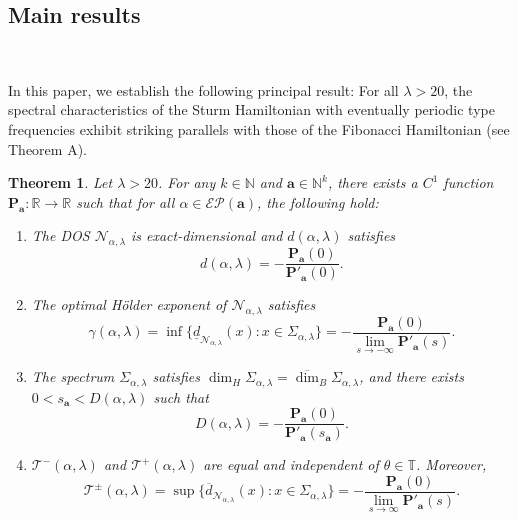 \documentclass[reqno,11pt,graphicx,]{amsart}
\numberwithin{equation}{section}
\theoremstyle{plain}
\newcommand{\N}{{\mathbb N}}
\newcommand{\R}{{\mathbb R}}
\newcommand{\p}{\mathbf P}
\newcommand{\3}{\mathbf{3}}
\newcommand{\ma}{\mathbf{a}}
\newtheorem{theorem}{Theorem}[section]
\begin{document}
	\subsection{Main results}\
	
	
	In this paper, we establish the following principal result: For all $\lambda>20$, the spectral characteristics of the Sturm Hamiltonian with eventually periodic type frequencies exhibit striking parallels with those of the Fibonacci Hamiltonian (see Theorem A).
	\begin{theorem}\label{main-result}
		Let $\lambda>20$. For any $k\in\N$ and $\ma\in\N^k$, there exists a $C^1$ function $\p_{\ma}:\R\to\R$ such that for all $\alpha\in\mathcal{EP}(\ma)$, the following hold:
		\begin{enumerate}[label=(\roman*)]
			\item The DOS $\mathcal{N}_{\alpha,\lambda}$ is exact-dimensional and $d(\alpha,\lambda)$ satisfies
			\begin{equation*}\label{1}
				d(\alpha,\lambda)=%
				-\frac{\p_{\ma}(0)}{\p'_{\ma}(0)}.
			\end{equation*}
			\item The optimal H\"older exponent of $\mathcal{N}_{\alpha,\lambda}$ satisfies 
			\begin{equation}\label{2} \gamma(\alpha,\lambda)=\inf\{\underline{d}_{\mathcal{N}_{\alpha,\lambda}}(x):x\in\Sigma_{\alpha,\lambda}\}=-\frac{\p_{\ma}(0)}{\lim\limits_{s\to-\infty}\p'_{\ma}(s)}.
			\end{equation}
			\item
			The spectrum $\Sigma_{\alpha,\lambda}$ satisfies
			$
			\dim_H \Sigma_{\alpha,\lambda}=\overline{\dim}_B \Sigma_{\alpha,\lambda}
			$, and there exists $0<s_{\ma}<D(\alpha,\lambda)$ such that
			\begin{equation}\label{3}
				D(\alpha,\lambda)%
				=-\frac{\p_{\ma}(0)}{\p'_{\ma}(s_{\ma})}.
			\end{equation}
			\item $\mathcal{T}^-(\alpha,\lambda)$ and $\mathcal{T}^+(\alpha,\lambda)$ are equal and independent of $\theta\in\mathbb{T}$. Moreover, 
			\begin{equation}\label{4}
				\mathcal{T}^{\pm}(\alpha,\lambda)=\sup\{\overline{d}_{\mathcal{N}_{\alpha,\lambda}}(x):x\in\Sigma_{\alpha,\lambda}\}=-\frac{\p_{\ma}(0)}{\lim\limits_{s\to\infty}\p'_{\ma}(s)}.

\end{equation}
\end{enumerate}
\end{theorem}
\end{document}
